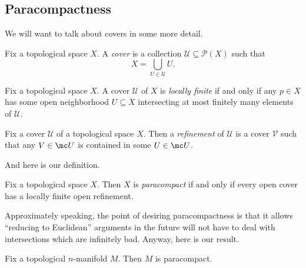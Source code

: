 \documentclass[../notes.tex]{subfiles}
\begin{document}
\subsection{Paracompactness}
We will want to talk about covers in some more detail.
\begin{definition}[cover]
	Fix a topological space $X$. A \textit{cover} is a collection $\mathcal U\subseteq\mathcal P(X)$ such that
	\[X=\bigcup_{U\in\mathcal U}U.\]
\end{definition}
\begin{definition}
	Fix a topological space $X$. A cover $\mathcal U$ of $X$ is \textit{locally finite} if and only if any $p\in X$ has some open neighborhood $U\subseteq X$ intersecting at most finitely many elements of $\mathcal U$.
\end{definition}
\begin{definition}[refinement]
	Fix a cover $\mathcal U$ of a topological space $X$. Then a \textit{refinement} of $\mathcal U$ is a cover $\mathcal V$ such that any $V\in\mc U$ is contained in some $U\in\mc U$.
\end{definition}
And here is our definition.
\begin{definition}[paracompact]
	Fix a topological space $X$. Then $X$ is \textit{paracompact} if and only if every open cover has a locally finite open refinement.
\end{definition}
Approximately speaking, the point of desiring paracompactness is that it allows ``reducing to Euclidean'' arguments in the future will not have to deal with intersections which are infinitely bad. Anyway, here is our result.
\begin{proposition} \label{prop:get-paracompact}
	Fix a topological $n$-manifold $M$. Then $M$ is paracompact.
\end{proposition}
\end{document}
